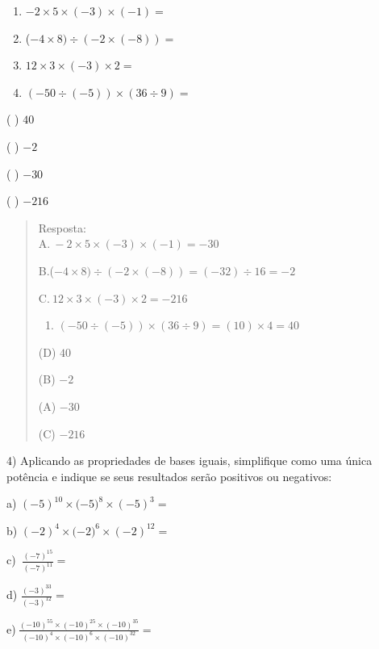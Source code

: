 \begin{enumerate}
\def\labelenumi{\Alph{enumi}.}
\item
  \(- 2 \times 5 \times \left( - 3 \right) \times \left( - 1 \right) =\)
\item
  (\(- 4 \times 8) \div ( - 2 \times \left( - 8 \right)) =\)
\item
  \(12 \times 3 \times \left( - 3 \right) \times 2 =\)
\item
  \(( - 50 \div \left( - 5 \right)) \times (36 \div 9) =\)
\end{enumerate}

( ) \(40\)

( ) \(- 2\)

( ) \(- 30\)

( ) \(- 216\)

\begin{quote}
Resposta:\\
A.\(\  - 2 \times 5 \times \left( - 3 \right) \times \left( - 1 \right) = - 30\)

B.(\(- 4 \times 8) \div ( - 2 \times \left( - 8 \right)) = \left( - 32 \right) \div 16 = - 2\)

C.\(\ 12 \times 3 \times \left( - 3 \right) \times 2 = - 216\)

\begin{enumerate}
\def\labelenumi{\Alph{enumi}.}
\setcounter{enumi}{3}
\tightlist
\item
  \(\left( - 50 \div \left( - 5 \right) \right) \times \left( 36 \div 9 \right) = \left( 10 \right) \times 4 = 40\)
\end{enumerate}

(D) \(40\)

(B) \(- 2\)

(A) \(- 30\)

(C) \(- 216\)
\end{quote}

4) Aplicando as propriedades de bases iguais, simplifique como uma única
potência e indique se seus resultados serão positivos ou negativos:

a) \({( - 5)}^{10} \times ( - {5)}^{8} \times {( - 5)}^{3} =\)

b) \({( - 2)}^{4} \times ( - {2)}^{6} \times {( - 2)}^{12} =\)

c) \(\ \frac{{( - 7)}^{15}}{{( - 7)}^{11}} =\)

d) \(\frac{{( - 3)}^{33}}{{( - 3)}^{12}} =\)

e)\(\ \frac{{( - 10)}^{55} \times {( - 10)}^{25} \times {( - 10)}^{35}}{{( - 10)}^{4} \times {( - 10)}^{6} \times {( - 10)}^{32}} =\)

